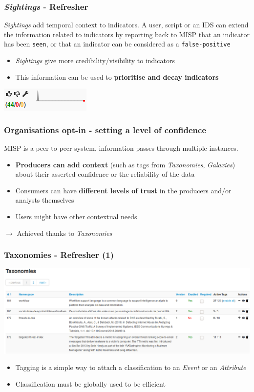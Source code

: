 \begin{frame}
    \frametitle{\textit{Sightings} - Refresher}
    \textit{Sightings} add temporal context to indicators.
    A user, script or an IDS can extend the information related to indicators by reporting back to MISP that
    an indicator has been \texttt{seen}, or that an indicator can be considered as a \texttt{false-positive}
    \vspace{0.5cm}
    \begin{itemize}
        \item \textit{Sightings} give more credibility/visibility to indicators
        \item This information can be used to {\bf prioritise and decay indicators}
    \end{itemize}
    \begin{center}
        \includegraphics[scale=1.00]{pics/sightings.png}
    \end{center}
\end{frame}

\begin{frame}
\frametitle{Organisations opt-in - setting a level of confidence}
    MISP is a peer-to-peer system, information passes through multiple instances.
    \begin{itemize}
        \item \textbf{Producers can add context} (such as tags from \textit{Taxonomies}, \textit{Galaxies}) about their asserted confidence or the reliability of the data
        \item Consumers can have \textbf{different levels of trust} in the producers and/or analysts themselves
        \item Users might have other contextual needs
    \end{itemize}
    \begin{center}
        $\rightarrow$ Achieved thanks to \textit{Taxonomies}
    \end{center}
\end{frame}

\begin{frame}
    \frametitle{Taxonomies - Refresher (1)}
    \includegraphics[width=1.00\linewidth]{pics/taxonomies.png}
    \begin{itemize}
        \item Tagging is a simple way to attach a classification to an \textit{Event} or an \textit{Attribute}
        \item Classification must be globally used to be efficient
    \end{itemize}
\end{frame}

